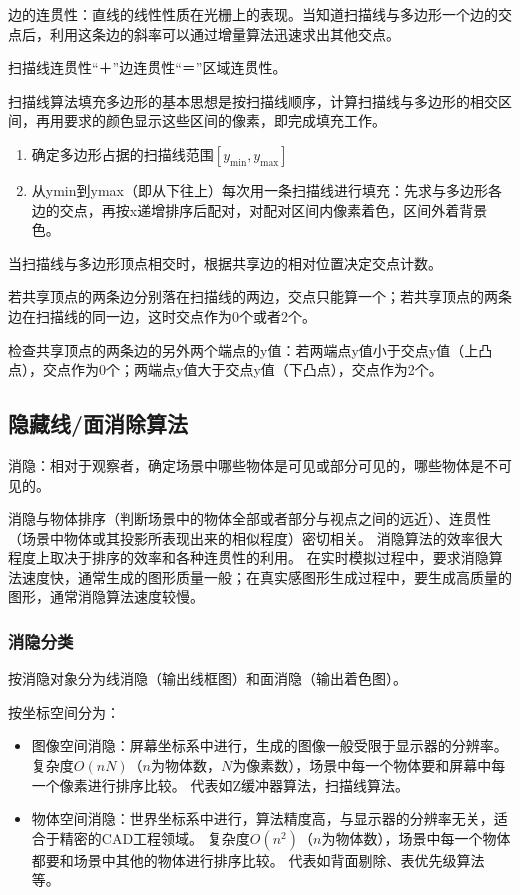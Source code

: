 \documentclass[12pt]{article}
\begin{document}
边的连贯性：直线的线性性质在光栅上的表现。当知道扫描线与多边形一个边的交点后，利用这条边的斜率可以通过增量算法迅速求出其他交点。

扫描线连贯性“＋”边连贯性“＝”区域连贯性。

扫描线算法填充多边形的基本思想是按扫描线顺序，计算扫描线与多边形的相交区间，再用要求的颜色显示这些区间的像素，即完成填充工作。

\begin{enumerate}
    \item 确定多边形占据的扫描线范围$[y_{\min}, y_{\max}]$
    \item 从ymin到ymax（即从下往上）每次用一条扫描线进行填充：先求与多边形各边的交点，再按x递增排序后配对，对配对区间内像素着色，区间外着背景色。
\end{enumerate}

当扫描线与多边形顶点相交时，根据共享边的相对位置决定交点计数。

若共享顶点的两条边分别落在扫描线的两边，交点只能算一个；若共享顶点的两条边在扫描线的同一边，这时交点作为0个或者2个。

检查共享顶点的两条边的另外两个端点的y值：若两端点y值小于交点y值（上凸点），交点作为0个；两端点y值大于交点y值（下凸点），交点作为2个。

\subsection{隐藏线/面消除算法}

消隐：相对于观察者，确定场景中哪些物体是可见或部分可见的，哪些物体是不可见的。

消隐与物体排序（判断场景中的物体全部或者部分与视点之间的远近）、连贯性（场景中物体或其投影所表现出来的相似程度）密切相关。
消隐算法的效率很大程度上取决于排序的效率和各种连贯性的利用。
在实时模拟过程中，要求消隐算法速度快，通常生成的图形质量一般；在真实感图形生成过程中，要生成高质量的图形，通常消隐算法速度较慢。

\subsubsection{消隐分类}
按消隐对象分为线消隐（输出线框图）和面消隐（输出着色图）。

按坐标空间分为：
\begin{itemize}
    \item 图像空间消隐：屏幕坐标系中进行，生成的图像一般受限于显示器的分辨率。
        复杂度$O(nN)$（$n$为物体数，$N$为像素数），场景中每一个物体要和屏幕中每一个像素进行排序比较。
        代表如Z缓冲器算法，扫描线算法。
    \item 物体空间消隐：世界坐标系中进行，算法精度高，与显示器的分辨率无关，适合于精密的CAD工程领域。
        复杂度$O(n^2)$（$n$为物体数），场景中每一个物体都要和场景中其他的物体进行排序比较。
        代表如背面剔除、表优先级算法等。
\end{itemize}
\end{document}
